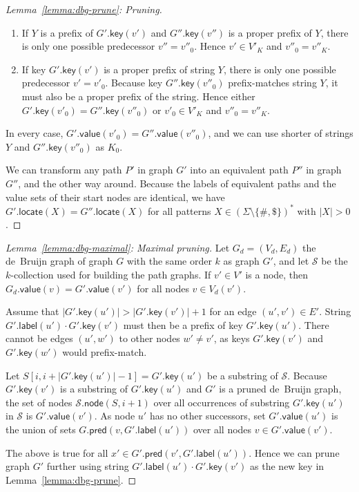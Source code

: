 \documentclass[twoside,leqno,twocolumn]{article}
\newcommand{\set}[1]{\ensuremath{\{ #1 \}}}
\newcommand{\abs}[1]{\ensuremath{\lvert #1 \rvert}}
\newcommand{\locate}{\ensuremath{\mathsf{locate}}}
\newcommand{\glabel}{\ensuremath{\mathsf{label}}}
\newcommand{\gpred}{\ensuremath{\mathsf{pred}}}
\newcommand{\gkey}{\ensuremath{\mathsf{key}}}
\newcommand{\gvalue}{\ensuremath{\mathsf{value}}}
\newcommand{\gnode}{\ensuremath{\mathsf{node}}}
\newcommand{\kcollection}[1]{$#1$\nobreakdash-collection}
\newcommand{\patternset}{\ensuremath{(\Sigma \setminus \set{\#, \$})^{\ast}}}
\begin{document}
\begin{proof}[Lemma~\ref{lemma:dbg-prune}: Pruning]
\begin{enumerate}
\item If $Y$ is a prefix of $G'.\gkey(v')$ and $G''.\gkey(v'')$ is a proper prefix of $Y$, there is only one possible predecessor $v'' = v''_{0}$. Hence $v' \in V'_{K}$ and $v''_{0} = v''_{K}$.

\item If key $G'.\gkey(v')$ is a proper prefix of string $Y$, there is only one possible predecessor $v' = v'_{0}$. Because key $G''.\gkey(v''_{0})$ prefix-matches string $Y$, it must also be a proper prefix of the string. Hence either $G'.\gkey(v'_{0}) = G''.\gkey(v''_{0})$ or $v'_{0} \in V'_{K}$ and $v''_{0} = v''_{K}$.
\end{enumerate}
In every case, $G'.\gvalue(v'_{0}) = G''.\gvalue(v''_{0})$, and we can use shorter of strings $Y$ and $G''.\gkey(v''_{0})$ as $K_{0}$.

We can transform any path $P'$ in graph $G'$ into an equivalent path $P''$ in graph $G''$, and the other way around. Because the labels of equivalent paths and the value sets of their start nodes are identical, we have $G'.\locate(X) = G''.\locate(X)$ for all patterns $X \in \patternset$ with $\abs{X} > 0$.
\end{proof}

\begin{proof}[Lemma~\ref{lemma:dbg-maximal}: Maximal pruning]
Let $G_{d} = (V_{d}, E_{d})$ the de~Bruijn graph of graph $G$ with the same order $k$ as graph $G'$, and let $\mathcal{S}$ be the \kcollection{k} used for building the path graphs. If $v' \in V'$ is a node, then $G_{d}.\gvalue(v) = G'.\gvalue(v')$ for all nodes $v \in V_{d}(v')$.

Assume that $\abs{G'.\gkey(u')} > \abs{G'.\gkey(v')}+1$ for an edge $(u', v') \in E'$. String $G'.\glabel(u') \cdot G'.\gkey(v')$ must then be a prefix of key $G'.\gkey(u')$. There cannot be edges $(u', w')$ to other nodes $w' \ne v'$, as keys $G'.\gkey(v')$ and $G'.\gkey(w')$ would prefix-match.

Let $S[i, i+\abs{G'.\gkey(u')}-1] = G'.\gkey(u')$ be a substring of $\mathcal{S}$. Because $G'.\gkey(v')$ is a substring of $G'.\gkey(u')$ and $G'$ is a pruned de~Bruijn graph, the set of nodes $\mathcal{S}.\gnode(S, i+1)$ over all occurrences of substring $G'.\gkey(u')$ in $\mathcal{S}$ is $G'.\gvalue(v')$. As node $u'$ has no other successors, set $G'.\gvalue(u')$ is the union of sets $G.\gpred(v, G'.\glabel(u'))$ over all nodes $v \in G'.\gvalue(v')$.

The above is true for all $x' \in G'.\gpred(v', G'.\glabel(u'))$. Hence we can prune graph $G'$ further using string $G'.\glabel(u') \cdot G'.\gkey(v')$ as the new key in Lemma~\ref{lemma:dbg-prune}.
\end{proof}
\end{document}
